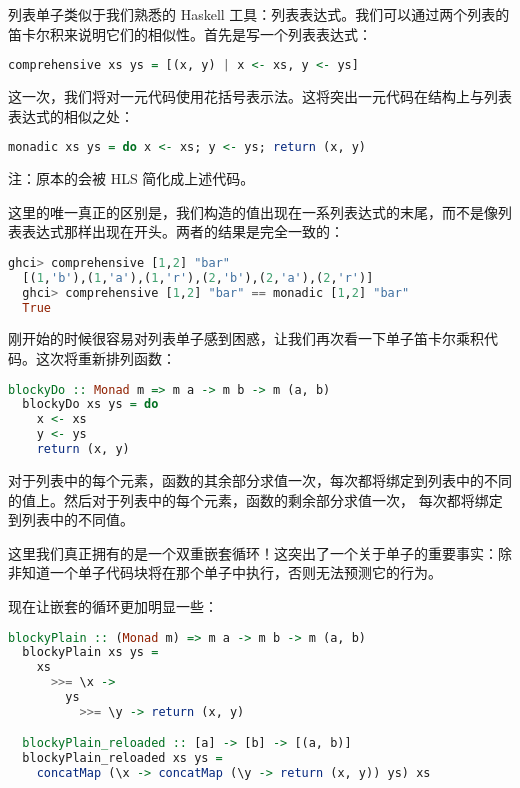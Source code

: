 \documentclass[./main.tex]{subfiles}
\begin{document}
列表单子类似于我们熟悉的 Haskell 工具：列表表达式。我们可以通过两个列表的笛卡尔积来说明它们的相似性。首先是写一个列表表达式：

\begin{lstlisting}[language=Haskell]
  comprehensive xs ys = [(x, y) | x <- xs, y <- ys]
\end{lstlisting}

这一次，我们将对一元代码使用花括号表示法。这将突出一元代码在结构上与列表表达式的相似之处：

\begin{lstlisting}[language=Haskell]
  monadic xs ys = do x <- xs; y <- ys; return (x, y)
\end{lstlisting}

注：原本的会被 HLS 简化成上述代码。

这里的唯一真正的区别是，我们构造的值出现在一系列表达式的末尾，而不是像列表表达式那样出现在开头。两者的结果是完全一致的：

\begin{lstlisting}[language=Haskell]
  ghci> comprehensive [1,2] "bar"
  [(1,'b'),(1,'a'),(1,'r'),(2,'b'),(2,'a'),(2,'r')]
  ghci> comprehensive [1,2] "bar" == monadic [1,2] "bar"
  True
\end{lstlisting}

刚开始的时候很容易对列表单子感到困惑，让我们再次看一下单子笛卡尔乘积代码。这次将重新排列函数：

\begin{lstlisting}[language=Haskell]
  blockyDo :: Monad m => m a -> m b -> m (a, b)
  blockyDo xs ys = do
    x <- xs
    y <- ys
    return (x, y)
\end{lstlisting}

对于列表中的每个元素，函数的其余部分求值一次，每次都将绑定到列表中的不同的值上。然后对于列表中的每个元素，函数的剩余部分求值一次，
每次都将绑定到列表中的不同值。

这里我们真正拥有的是一个双重嵌套循环！这突出了一个关于单子的重要事实：除非知道一个单子代码块将在那个单子中执行，否则无法预测它的行为。

现在让嵌套的循环更加明显一些：

\begin{lstlisting}[language=Haskell]
  blockyPlain :: (Monad m) => m a -> m b -> m (a, b)
  blockyPlain xs ys =
    xs
      >>= \x ->
        ys
          >>= \y -> return (x, y)

  blockyPlain_reloaded :: [a] -> [b] -> [(a, b)]
  blockyPlain_reloaded xs ys =
    concatMap (\x -> concatMap (\y -> return (x, y)) ys) xs
\end{lstlisting}
\end{document}
